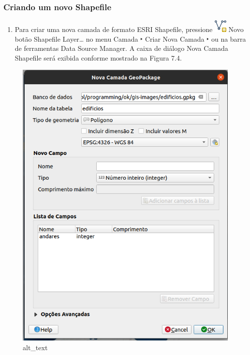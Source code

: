 \documentclass[
]{book}
\providecommand{\tightlist}{%
  \setlength{\itemsep}{0pt}\setlength{\parskip}{0pt}}
\begin{document}
\hypertarget{criando-um-novo-shapefile}{%
\subsubsection{\texorpdfstring{\textbf{Criando um novo Shapefile}}{Criando um novo Shapefile}}\label{criando-um-novo-shapefile}}

\begin{enumerate}
\def\labelenumi{\arabic{enumi}.}
\tightlist
\item
  Para criar uma nova camada de formato ESRI Shapefile, pressione \includegraphics{media/modulo7/mActionNewVectorLayer.png} Novo botão Shapefile Layer\ldots{} no menu Camada ‣ Criar Nova Camada ‣ ou na barra de ferramentas Data Source Manager. A caixa de diálogo Nova Camada Shapefile será exibida conforme mostrado na Figura 7.4.
\end{enumerate}

\begin{figure}
\centering
\includegraphics{media/modulo7/new-shapefile-dialog.png}
\caption{alt\_text}
\end{figure}
\end{document}
